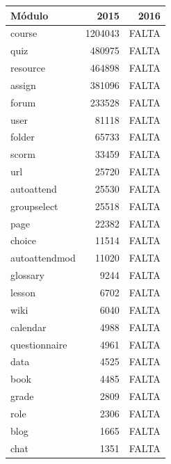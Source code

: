 \begin{table}[H]
\centering
\begin{tabular}{|l|r|r|}
\hline
\textbf{Módulo} & \textbf{2015} & \textbf{2016} \\ \hline
course          & 1204043       & FALTA         \\ \hline
quiz            & 480975        & FALTA         \\ \hline
resource        & 464898        & FALTA         \\ \hline
assign          & 381096        & FALTA         \\ \hline
forum           & 233528        & FALTA         \\ \hline
user            & 81118         & FALTA         \\ \hline
folder          & 65733         & FALTA         \\ \hline
scorm           & 33459         & FALTA         \\ \hline
url             & 25720         & FALTA         \\ \hline
autoattend      & 25530         & FALTA         \\ \hline
groupselect     & 25518         & FALTA         \\ \hline
page            & 22382         & FALTA         \\ \hline
choice          & 11514         & FALTA         \\ \hline
autoattendmod   & 11020         & FALTA         \\ \hline
glossary        & 9244          & FALTA         \\ \hline
lesson          & 6702          & FALTA         \\ \hline
wiki            & 6040          & FALTA         \\ \hline
calendar        & 4988          & FALTA         \\ \hline
questionnaire   & 4961          & FALTA         \\ \hline
data            & 4525          & FALTA         \\ \hline
book            & 4485          & FALTA         \\ \hline
grade           & 2809          & FALTA         \\ \hline
role            & 2306          & FALTA         \\ \hline
blog            & 1665          & FALTA         \\ \hline
chat            & 1351          & FALTA         \\ \hline

\end{tabular}
\end{table}
